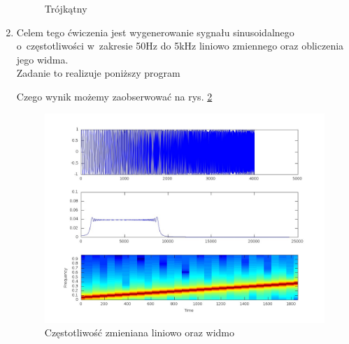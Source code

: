 \documentclass[11pt,a4paper]{article}
\begin{document}
\begin{enumerate}
\begin{figure}
\caption{Trójkątny}
\label{fig:trojkat}
\end{figure}
\newpage
\item Celem tego ćwiczenia jest wygenerowanie sygnału sinusoidalnego o~częstotliwości w~zakresie 50Hz do 5kHz liniowo zmiennego oraz obliczenia jego widma.\\
Zadanie to realizuje poniższy program

Czego wynik możemy zaobserwować na rys. \ref{fig:liniowo}
\begin{figure}
\hspace{-10em}
\includegraphics[scale=0.5]{proba2_1.jpg}
\caption{Częstotliwość zmieniana liniowo oraz widmo}
\label{fig:liniowo}
\end{figure}
\newpage
\end{enumerate}
\end{document}
